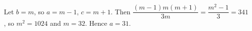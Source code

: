 Let $b=m$, so $a=m-1$, $c=m+1$. Then $\dfrac{(m-1)m(m+1)}{3m}=\dfrac{m^2-1}{3}=341$, so $m^2=1024$ and $m=32$. Hence $a=\boxed{31}$.

